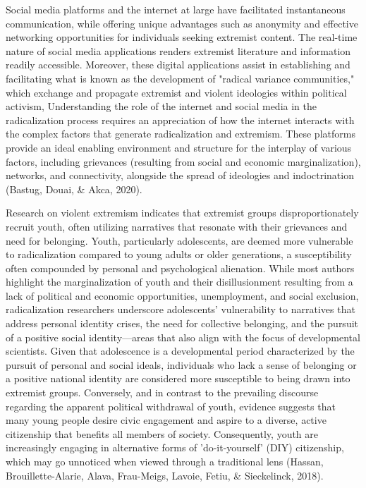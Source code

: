 \documentclass[10pt]{NSP1}
\begin{document}
Social media platforms and the internet at large have facilitated instantaneous communication, while offering unique advantages such as anonymity and effective networking opportunities for individuals seeking extremist content. The real-time nature of social media applications renders extremist literature and information readily accessible. Moreover, these digital applications assist in establishing and facilitating what is known as the development of "radical variance communities," which exchange and propagate extremist and violent ideologies within political activism, Understanding the role of the internet and social media in the radicalization process requires an appreciation of how the internet interacts with the complex factors that generate radicalization and extremism. These platforms provide an ideal enabling environment and structure for the interplay of various factors, including grievances (resulting from social and economic marginalization), networks, and connectivity, alongside the spread of ideologies and indoctrination (Bastug, Douai, \& Akca, 2020).

Research on violent extremism indicates that extremist groups disproportionately recruit youth, often utilizing narratives that resonate with their grievances and need for belonging. Youth, particularly adolescents, are deemed more vulnerable to radicalization compared to young adults or older generations, a susceptibility often compounded by personal and psychological alienation. While most authors highlight the marginalization of youth and their disillusionment resulting from a lack of political and economic opportunities, unemployment, and social exclusion, radicalization researchers underscore adolescents' vulnerability to narratives that address personal identity crises, the need for collective belonging, and the pursuit of a positive social identity—areas that also align with the focus of developmental scientists. Given that adolescence is a developmental period characterized by the pursuit of personal and social ideals, individuals who lack a sense of belonging or a positive national identity are considered more susceptible to being drawn into extremist groups. Conversely, and in contrast to the prevailing discourse regarding the apparent political withdrawal of youth, evidence suggests that many young people desire civic engagement and aspire to a diverse, active citizenship that benefits all members of society. Consequently, youth are increasingly engaging in alternative forms of 'do-it-yourself' (DIY) citizenship, which may go unnoticed when viewed through a traditional lens (Hassan, Brouillette-Alarie, Alava, Frau-Meigs, Lavoie, Fetiu, \& Sieckelinck, 2018).
\end{document}
